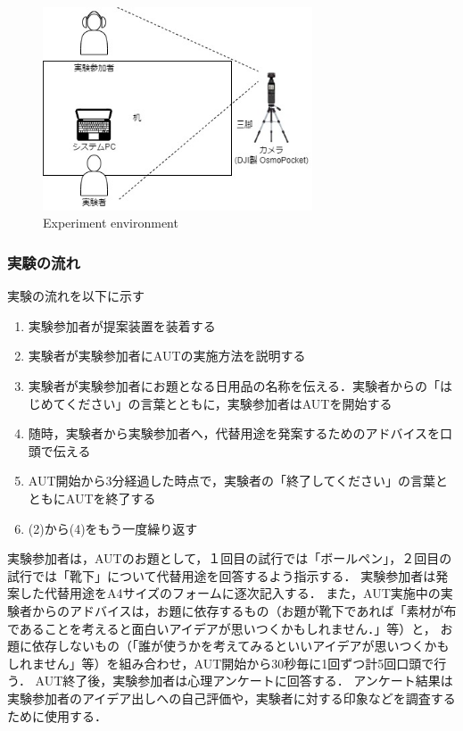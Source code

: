 \documentclass[a4paper]{jarticle}
\begin{document}
\begin{figure}[htbp]
    \begin{center}
    \includegraphics[width=80mm]{configuration.jpg}
    \caption{Experiment environment}
    \label{fig:env}
    \end{center}
    \end{figure}
\subsubsection{実験の流れ}
実験の流れを以下に示す
\begin{enumerate}
    \item 実験参加者が提案装置を装着する
    \item 実験者が実験参加者にAUTの実施方法を説明する
    \item 実験者が実験参加者にお題となる日用品の名称を伝える．実験者からの「はじめてください」の言葉とともに，実験参加者はAUTを開始する
    \item 随時，実験者から実験参加者へ，代替用途を発案するためのアドバイスを口頭で伝える
    \item AUT開始から3分経過した時点で，実験者の「終了してください」の言葉とともにAUTを終了する
    \item (2)から(4)をもう一度繰り返す
\end{enumerate}

実験参加者は，AUTのお題として，１回目の試行では「ボールペン」，２回目の試行では「靴下」について代替用途を回答するよう指示する．
実験参加者は発案した代替用途をA4サイズのフォームに逐次記入する．
また，AUT実施中の実験者からのアドバイスは，お題に依存するもの（お題が靴下であれば「素材が布であることを考えると面白いアイデアが思いつくかもしれません．」等）と，
お題に依存しないもの（「誰が使うかを考えてみるといいアイデアが思いつくかもしれません」等）を組み合わせ，AUT開始から30秒毎に1回ずつ計5回口頭で行う．
AUT終了後，実験参加者は心理アンケートに回答する．
アンケート結果は実験参加者のアイデア出しへの自己評価や，実験者に対する印象などを調査するために使用する．
\end{document}
